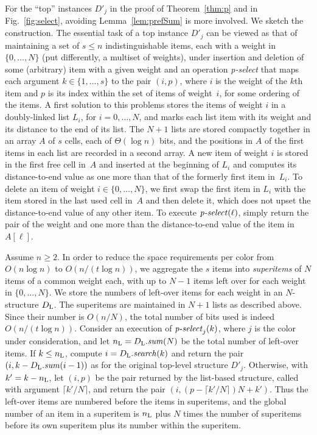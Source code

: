 \documentclass[envcountsame,envcountsect,undated,nolinenumbers]{lnthi}
\def\Tvn#1{\hbox{\textit{#1\/}}}
\def\Tceil#1{\lceil #1\rceil}
\begin{document}
For the ``top'' instances $D'_j$ in the proof of
Theorem~\ref{thm:p} and in Fig.~\ref{fig:select},
avoiding Lemma~\ref{lem:prefSum} is more involved.
We sketch the construction.
The essential task of a top instance
$D'_j$ can be viewed as that of
maintaining a set of $s\le n$ indistinguishable
items, each with a weight in $\{0,\ldots,N\}$
(put differently, a multiset of weights),
under insertion and deletion of some (arbitrary) item
with a given weight and
an operation \Tvn{p-select} that maps each argument
$k\in\{1,\ldots,s\}$ to the pair $(i,p)$,
where $i$ is the weight of the
$k$th item and $p$ is its index 
within the set of items of weight~$i$,
for some ordering of the items.
A first solution to this problems stores the
items of weight $i$ in a doubly-linked list $L_i$,
for $i=0,\ldots,N$, and marks each list item
with its weight and
its distance to the end of its list.
The $N+1$ lists are stored compactly together in an
array $A$ of $s$ cells, each of $\Theta(\log n)$ bits,
and the positions in $A$ of the first items in each list
are recorded in a second array.
A new item of weight $i$
is stored in the first free cell in~$A$
and inserted at the beginning of $L_i$
and computes its distance-to-end value
as one more than that
of the formerly first item in~$L_i$.
To delete an item of weight $i\in\{0,\ldots,N\}$,
we first swap the first item in $L_i$ with the
item stored in the last used cell in~$A$
and then delete it,
which does not upset
the distance-to-end value of any other item.
To execute $\Tvn{p-select}(\ell)$, simply return
the pair of
the weight and one more than the distance-to-end value of the
item in $A[\ell]$.

Assume $n\ge 2$.
In order to reduce the space requirements
per color
from $O(n\log n)$ to $O({n/{(t\log n)}})$,
we aggregate the $s$ items into \emph{superitems}
of $N$ items of a common weight each, with up to $N-1$ items
left over for each weight in $\{0,\ldots,N\}$.
We store the numbers of left-over items
for each weight in an
$N$-structure $D_{\mbox{\scriptsize L}}$.
The superitems are maintained in $N+1$ lists
as described above.
Since their number is $O({n/N})$, the total
number of bits used is indeed $O({n/{(t\log n)}})$.
Consider an execution of $\Tvn{p-select}_j(k)$,
where $j$ is the color under consideration,
and let $n\Tsub L=D\Tsub L.\Tvn{sum}(N)$
be the total number of left-over items.
If $k\le n_{\mbox{\scriptsize L}}$,
compute $i=D\Tsub L.\Tvn{search}(k)$
and return the pair
$(i,k-D\Tsub L.\Tvn{sum}(i-1))$ as for the original
top-level structure $D'_j$.
Otherwise, with $k'=k-n_{\mbox{\scriptsize L}}$,
let $(i,p)$ be the
pair returned by the list-based structure,
called with argument $\Tceil{{{k'}/N}}$,
and return the pair $(i,(p-\Tceil{{k'}/N})N+k')$.
Thus the left-over items are numbered before
the items in superitems, and the global number of
an item in a superitem is $n_{\mbox{\scriptsize L}}$ plus $N$ times the
number of superitems before
its own superitem plus its number
within the superitem.
\end{document}
